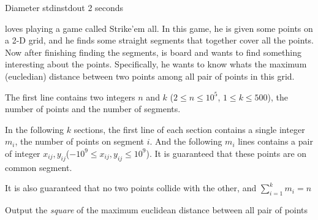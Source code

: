 \begin{problem}{Diameter}
{stdin}{stdout}
{2 seconds}{}{}

\pittoresque loves playing a game called Strike'em all. In this game, he is given some points on a 2-D grid, and he finds some straight segments that together cover all the points. Now after finishing finding the segments, \pittoresque is board and wants to find something interesting about the points. Specifically, he wants to know whats the maximum (eucledian) distance between two points among all pair of points in this grid.

\InputFile

The first line contains two integers $n$ and $k$ ($2 \le n \le 10^5$, $1 \le k \le 500$), the number of points and the number of segments.

In the following $k$ sections, the first line of each section contains a single integer $m_i$, the number of points on segment $i$. And the following $m_i$ lines contains a pair of integer $x_{ij}, y_{ij}$($-10^9 \le x_{ij}, y_{ij} \le 10^9$). It is guaranteed that these points are on common segment.

It is also guaranteed that no two points collide with the other, and $\sum_{i = 1}^{k} m_i = n$

\OutputFile

Output the \textit{square} of the maximum  euclidean distance between all pair of points

\Examples

\begin{example}
%
\end{example}

\begin{example}
%
\end{example}



\end{problem}
